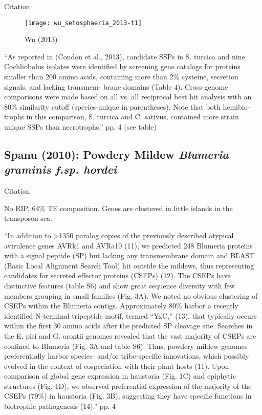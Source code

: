   Citation \cite{wu_setosphaeria_2013}

  \begin{figure}[h!] \centering
    \texttt{[image: wu\_setosphaeria\_2013-t1]}
    \caption{Wu (2013) \cite{wu_setosphaeria_2013}}
  \end{figure}

  ``As reported in (Condon et al., 2013), candidate SSPs in S. turcica and
  nine Cochliobolus isolates were identified by screening gene catalogs for
  proteins smaller than 200 amino acids, containing more than 2\% cysteine,
  secretion signals, and lacking transmem- brane domains (Table 4).
  Cross-genome comparisons were made based on all vs. all reciprocal best hit
  analysis with an 80\% similarity cutoff (species-unique in parentheses).
  Note that both hemibio- trophs in this comparison, S. turcica and C.
  sativus, contained more strain unique SSPs than necrotrophs.'' pp. 4 (see
  table)

  \FloatBarrier
\subsection{Spanu (2010): Powdery Mildew \textit{ Blumeria graminis f.sp. hordei}}

  Citation \cite{spanu_genome_2010}

  No RIP, 64\% TE composition. Genes are clustered in little islands in the transposon sea.


  ``In addition to >1350 paralog copies of the previously described atypical
  avirulence genes AVRk1 and AVRa10 (11), we predicted 248 Blumeria proteins with
  a signal peptide (SP) but lacking any transmembrane domain and BLAST (Basic
  Local Alignment Search Tool) hit outside the mildews, thus representing
  candidates for secreted effector proteins (CSEPs) (12). The CSEPs have
  distinctive features (table S6) and show great sequence diversity with few
  members grouping in small families (Fig. 3A). We noted no obvious clustering of
  CSEPs within the Blumeria contigs. Approximately 80\% harbor a recently
  identified N-terminal tripeptide motif, termed “YxC,” (13), that typically
  occurs within the first 30 amino acids after the predicted SP cleavage site.
  Searches in the E. pisi and G. orontii genomes revealed that the vast majority
  of CSEPs are confined to Blumeria (Fig. 3A and table S6).  Thus, powdery mildew
  genomes preferentially harbor species- and/or tribe-specific innovations, which
  possibly evolved in the context of cospeciation with their plant hosts (11).
  Upon comparison of global gene expression in haustoria (Fig. 1C) and epiphytic
  structures (Fig. 1D), we observed preferential expression of the majority of
  the CSEPs (79\%) in haustoria (Fig. 3B), suggesting they have specific
  functions in biotrophic pathogenesis (14).'' pp. 4

